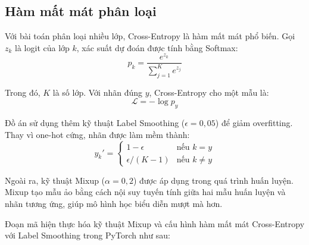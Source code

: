 \subsection{Hàm mất mát phân loại}

Với bài toán phân loại nhiều lớp, Cross-Entropy là hàm mất mát phổ biến. Gọi $z_k$ là logit của lớp $k$, xác suất dự đoán được tính bằng Softmax:
\begin{equation}
  p_k=\frac{e^{z_k}}{\sum_{j=1}^{K}e^{z_j}}
\end{equation}

Trong đó, $K$ là số lớp. Với nhãn đúng $y$, Cross-Entropy cho một mẫu là:
\begin{equation}
  \mathcal{L}=-\log p_y
\end{equation}

Đồ án sử dụng thêm kỹ thuật Label Smoothing ($\epsilon=0{,}05$) để giảm overfitting. Thay vì one-hot cứng, nhãn được làm mềm thành:
\begin{equation}
  y_k'=\begin{cases} 1-\epsilon & \text{nếu } k=y \\ \epsilon/(K-1) & \text{nếu } k\neq y \end{cases}
\end{equation}

Ngoài ra, kỹ thuật Mixup ($\alpha=0{,}2$) được áp dụng trong quá trình huấn luyện. Mixup tạo mẫu ảo bằng cách nội suy tuyến tính giữa hai mẫu huấn luyện và nhãn tương ứng, giúp mô hình học biểu diễn mượt mà hơn.

Đoạn mã hiện thực hóa kỹ thuật Mixup và cấu hình hàm mất mát Cross-Entropy với Label Smoothing trong PyTorch như sau:

